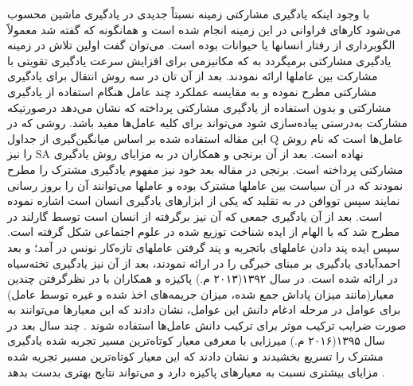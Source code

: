\documentclass[12pt,a4paper]{article}
\begin{document}
با وجود اینکه یادگیری مشارکتی زمینه نسبتاً جدیدی در یادگیری ماشین محسوب می‌شود کارهای فراوانی در این زمینه انجام
شده است و همانگونه که گفته شد معمولاً الگوبرداری از رفتار انسانها یا حیوانات بوده است. می‌توان گفت اولین تلاش در زمینه
یادگیری مشارکتی برمیگردد به  که مکانیزمی برای افزایش سرعت یادگیری تقویتی با مشارکت بین عاملها ارائه نمودند.
بعد از آن تان در  سه روش انتقال برای یادگیری مشارکتی مطرح نموده و به مقایسه عملکرد چند عامل هنگام استفاده از یادگیری
مشارکتی و بدون استفاده از یادگیری مشارکتی پرداخته که نشان می‌دهد درصورتیکه مشارکت به‌درستی پیاده‌سازی شود می‌تواند
برای کلیه عامل‌ها مفید باشد. روشی که در این مقاله استفاده شده بر اساس میانگین‌گیری از جداول Q عامل‌ها است که نام روش را
نیز SA نهاده است. بعد از آن برنجی و همکاران در  به مزایای روش یادگیری مشارکتی پرداخته است.
برنجی در مقاله بعد خود
نیز مفهوم یادگیری مشترک را مطرح نمودند که در آن سیاست بین عاملها مشترک بوده و عاملها می‌توانند آن را بروز رسانی
نمایند  سپس تووافن در  به تقلید که یکی از ابزارهای یادگیری انسان است اشاره نموده است. بعد از آن یادگیری جمعی
که آن نیز برگرفته از انسان است توسط گارلند در  مطرح شد که با الهام از ایده شناخت توزیع شده در علوم اجتماعی شکل گرفته
است. سپس ایده پند دادن عاملهای باتجربه و پند گرفتن عاملهای تازه‌کار نونس در  آمد؛ و بعد احمدآبادی یادگیری بر مبنای
خبرگی را در  ارائه نمودند، بعد از آن نیز یادگیری تخته‌سیاه در  ارائه شده است.
در سال ۱۳۹۲(۲۰۱۳ م.) پاکیزه و همکاران با در نظرگرفتن چندین معیار(مانند میزان پاداش جمع شده، میزان جریمه‌های اخذ شده و غیره توسط عامل) برای عوامل در مرحله ادغام دانش این عوامل، نشان دادند که این معیارها می‌توانند به صورت ضرایب ترکیب موثر برای ترکیب دانش عامل‌ها استفاده شوند . چند سال بعد در سال ۱۳۹۵(۲۰۱۶ م.) میرزایی با معرفی معیار کوتاه‌ترین مسیر تجربه شده یادگیری مشترک را تسریع بخشیدند و نشان دادند که این معیار کوتاه‌ترین مسیر تجریه شده مزایای بیشتری نسبت به معیارهای پاکیزه دارد و می‌تواند نتایج بهتری بدست بدهد .
\end{document}
